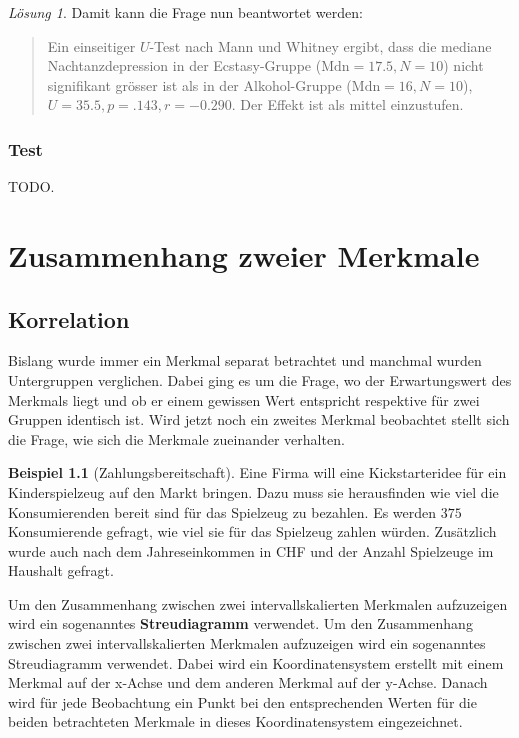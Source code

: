 \documentclass[
]{book}
\theoremstyle{definition}
\theoremstyle{definition}
\newtheorem{example}{Beispiel}[chapter]
\theoremstyle{definition}
\theoremstyle{definition}
\theoremstyle{remark}
\newtheorem*{solution}{Lösung}
\begin{document}
\begin{solution}
Damit kann die Frage nun beantwortet werden:

\begin{quote}
Ein einseitiger \(U\)-Test nach Mann und Whitney ergibt, dass die
mediane Nachtanzdepression in der Ecstasy-Gruppe
(\(\text{Mdn}=17.5, N = 10\)) nicht signifikant grösser ist als in der
Alkohol-Gruppe (\(\text{Mdn}= 16, N =10\)),
\(U = 35.5, p = .143, r = -0.290\). Der Effekt ist als mittel
einzustufen.
\end{quote}

\end{solution}

\section{Test}\label{test-3}

TODO.

\part{Zusammenhang zweier Merkmale}\label{part-zusammenhang-zweier-merkmale}

\chapter{Korrelation}\label{korrelation}

Bislang wurde immer ein Merkmal separat betrachtet und manchmal wurden Untergruppen verglichen. Dabei ging es um die Frage, wo der Erwartungswert des Merkmals liegt und ob er einem gewissen Wert entspricht respektive für zwei Gruppen identisch ist. Wird jetzt noch ein zweites Merkmal beobachtet stellt sich die Frage, wie sich die Merkmale zueinander verhalten.

\begin{example}[Zahlungsbereitschaft]
\protect\hypertarget{exm:zahlungsbereitschaft}{}\label{exm:zahlungsbereitschaft}Eine Firma will eine Kickstarteridee für ein Kinderspielzeug auf den Markt bringen. Dazu muss sie herausfinden wie viel die Konsumierenden bereit sind für das Spielzeug zu bezahlen. Es werden \(375\) Konsumierende gefragt, wie viel sie für das Spielzeug zahlen würden. Zusätzlich wurde auch nach dem Jahreseinkommen in CHF und der Anzahl Spielzeuge im Haushalt gefragt.
\end{example}

\label{customdef-streudiagramm}{Um den Zusammenhang zwischen zwei intervallskalierten Merkmalen aufzuzeigen wird ein sogenanntes \textbf{Streudiagramm} verwendet.} Um den Zusammenhang zwischen zwei intervallskalierten Merkmalen aufzuzeigen wird ein sogenanntes Streudiagramm verwendet. Dabei wird ein Koordinatensystem erstellt mit einem Merkmal auf der x-Achse und dem anderen Merkmal auf der y-Achse. Danach wird für jede Beobachtung ein Punkt bei den entsprechenden Werten für die beiden betrachteten Merkmale in dieses Koordinatensystem eingezeichnet.
\end{document}
